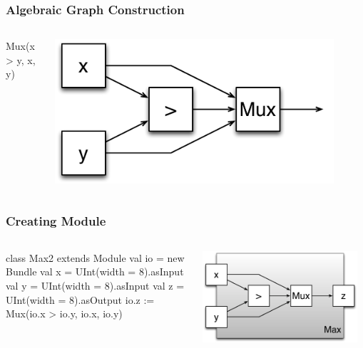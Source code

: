\documentclass[xcolor=pdflatex,dvipsnames,table]{beamer}
\begin{document}
\begin{frame}[fragile]
\frametitle{Algebraic Graph Construction}

\begin{columns}
{
\begin{scala}
Mux(x > y, x, y)
\end{scala}
}


\begin{center}
\includegraphics[width=0.9\textwidth]{figs/max2.pdf} 
\end{center}
\end{columns}
\end{frame}

\begin{frame}[fragile]
\frametitle{Creating Module}

\begin{columns}

{
\begin{scala}
class Max2 extends Module {
  val io = new Bundle {
    val x = UInt(width = 8).asInput
    val y = UInt(width = 8).asInput
    val z = UInt(width = 8).asOutput }
  io.z := Mux(io.x > io.y, io.x, io.y)
}
\end{scala}
}

\begin{center}
\includegraphics[width=0.95\textwidth]{figs/Max2c.pdf} \\
\end{center}
\end{columns}

\end{frame}
\end{document}
